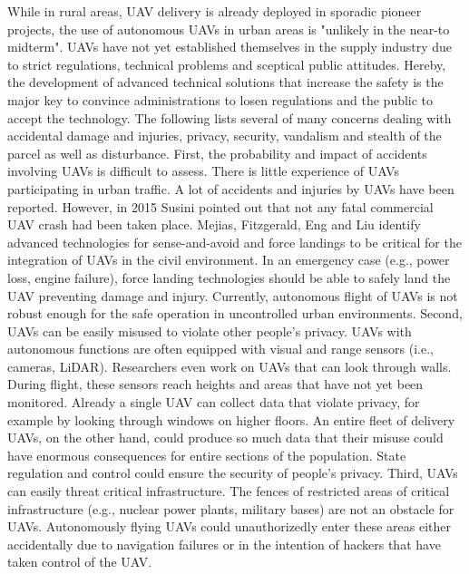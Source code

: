 While in rural areas, UAV delivery is already deployed in sporadic pioneer projects, 
the use of autonomous UAVs in urban areas is "unlikely in the near-to midterm". \cite{Bouton2017}
UAVs have not yet established themselves in the supply industry 
due to strict regulations, technical problems and sceptical public attitudes. \cite{Rosen2019}
Hereby, the development of advanced technical solutions that increase the safety is the major key
to convince administrations to losen regulations and the public to accept the technology. \cite{Intech2009}
The following lists several of many concerns dealing with accidental damage and injuries, 
privacy, security, vandalism and stealth of the parcel as well as disturbance.
First, the probability and impact of accidents involving UAVs is difficult to assess.
There is little experience of UAVs participating in urban traffic.
A lot of accidents and injuries by UAVs have been reported. \cite{Forrest2018}
However, in 2015 Susini \cite{Susini2015} pointed out that not any fatal commercial UAV crash had been taken place.
Mejias, Fitzgerald, Eng and Liu \cite{Intech2009} identify
advanced technologies for sense-and-avoid and force landings to be critical for the integration of UAVs in the civil environment.
In an emergency case (e.g., power loss, engine failure), 
force landing technologies should be able to safely land the UAV preventing damage and injury.
Currently, autonomous flight of UAVs is not robust enough for the safe operation in uncontrolled urban environments. \cite{loquercio2018learning}
Second, UAVs can be easily misused to violate other people's privacy.
UAVs with autonomous functions are often equipped with visual and range sensors (i.e., cameras, LiDAR).
Researchers even work on UAVs that can look through walls. \cite{Biggs2017}
During flight, these sensors reach heights and areas that have not yet been monitored.
Already a single UAV can collect data that violate privacy, for example by looking through windows on higher floors.
An entire fleet of delivery UAVs, on the other hand, could produce so much data that their misuse could have enormous consequences for
entire sections of the population.
State regulation and control could ensure the security of people's privacy.
Third, UAVs can easily threat critical infrastructure.
The fences of restricted areas of critical infrastructure (e.g., nuclear power plants, military bases) are not an obstacle for UAVs.
Autonomously flying UAVs could unauthorizedly enter these areas either accidentally due to navigation failures
or in the intention of hackers that have taken control of the UAV.

